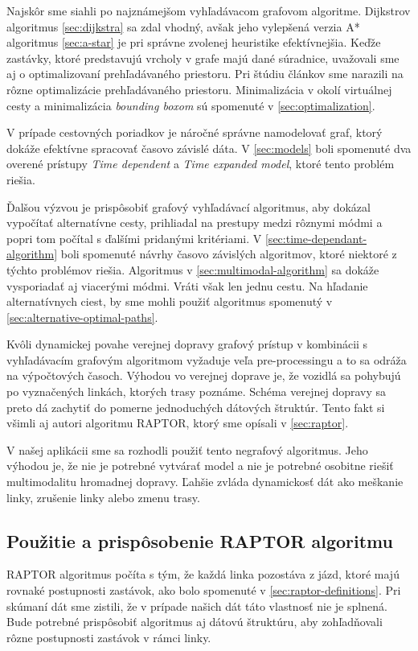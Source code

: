 Najskôr sme siahli po najznámejšom vyhľadávacom grafovom algoritme. Dijkstrov algoritmus \ref{sec:dijkstra} sa zdal vhodný, avšak jeho vylepšená verzia A* algoritmus \ref{sec:a-star} je pri správne zvolenej heuristike efektívnejšia. Keďže zastávky, ktoré predstavujú vrcholy v grafe majú dané súradnice, uvažovali sme aj o optimalizovaní prehľadávaného priestoru. Pri štúdiu článkov sme narazili na rôzne optimalizácie prehľadávaného priestoru. Minimalizácia v okolí virtuálnej cesty a minimalizácia \textit{bounding boxom} sú spomenuté v \ref{sec:optimalization}.

V prípade cestovných poriadkov je náročné správne namodelovať graf, ktorý dokáže efektívne spracovať časovo závislé dáta. V \ref{sec:models} boli spomenuté dva overené prístupy \textit{Time dependent} a \textit{Time expanded model}, ktoré tento problém riešia. 

Ďalšou výzvou je prispôsobiť grafový vyhľadávací algoritmus, aby dokázal vypočítať alternatívne cesty, prihliadal na prestupy medzi rôznymi módmi a popri tom počítal s ďalšími pridanými kritériami.
V \ref{sec:time-dependant-algorithm} boli spomenuté návrhy časovo závislých algoritmov, ktoré niektoré z týchto problémov riešia. Algoritmus v \ref{sec:multimodal-algorithm} sa dokáže vysporiadať aj viacerými módmi. Vráti však len jednu cestu. Na hľadanie alternatívnych ciest, by sme mohli použiť algoritmus spomenutý v \ref{sec:alternative-optimal-paths}.

Kvôli dynamickej povahe verejnej dopravy grafový prístup v kombinácii s vyhľadávacím grafovým algoritmom vyžaduje veľa pre-processingu a to sa odráža na výpočtových časoch. Výhodou vo verejnej doprave je, že vozidlá sa pohybujú po vyznačených linkách, ktorých trasy poznáme. Schéma verejnej dopravy sa preto dá zachytiť do pomerne jednoduchých dátových štruktúr. Tento fakt si všimli aj autori algoritmu RAPTOR, ktorý sme opísali v \ref{sec:raptor}. 

V našej aplikácii sme sa rozhodli použiť tento negrafový algoritmus. Jeho výhodou je, že nie je potrebné vytvárať model a nie je potrebné osobitne riešiť multimodalitu hromadnej dopravy. Ľahšie zvláda dynamickosť dát ako meškanie linky, zrušenie linky alebo zmenu trasy. 

\subsection{Použitie a prispôsobenie RAPTOR algoritmu}
RAPTOR algoritmus počíta s tým, že každá linka pozostáva z jázd, ktoré majú rovnaké postupnosti zastávok, ako bolo spomenuté v \ref{sec:raptor-definitions}. Pri skúmaní dát sme zistili, že v prípade našich dát táto vlastnosť nie je splnená. Bude potrebné prispôsobiť algoritmus aj dátovú štruktúru, aby zohľadňovali rôzne postupnosti zastávok v rámci linky.

